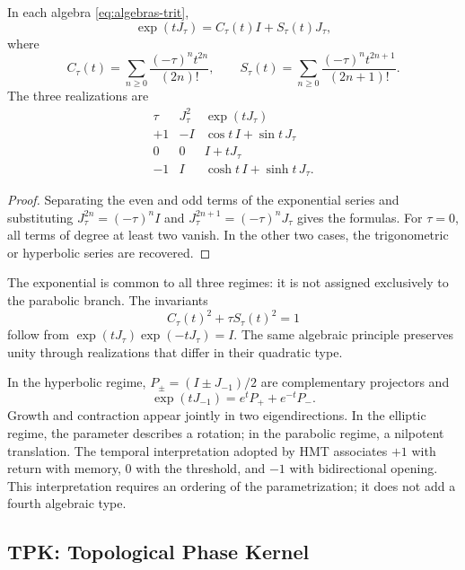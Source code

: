 \begin{proposition}
In each algebra \eqref{eq:algebras-trit},
\begin{equation}
 \exp(tJ_\tau)=C_\tau(t)I+S_\tau(t)J_\tau,
\end{equation}
where
\[
 C_\tau(t)=\sum_{n\ge0}\frac{(-\tau)^nt^{2n}}{(2n)!},\qquad
 S_\tau(t)=\sum_{n\ge0}\frac{(-\tau)^nt^{2n+1}}{(2n+1)!}.
\]
The three realizations are
\[
 \begin{array}{c|c|c}
 \tau&J_\tau^2&\exp(tJ_\tau)\\\hline
 +1&-I&\cos t\,I+\sin t\,J_\tau\\
 0&0&I+tJ_\tau\\
 -1&I&\cosh t\,I+\sinh t\,J_\tau.
 \end{array}
\]
\end{proposition}
\begin{proof}
Separating the even and odd terms of the exponential series and substituting \(J_\tau^{2n}=(-\tau)^nI\) and \(J_\tau^{2n+1}=(-\tau)^nJ_\tau\) gives the formulas. For \(\tau=0\), all terms of degree at least two vanish. In the other two cases, the trigonometric or hyperbolic series are recovered.
\end{proof}

The exponential is common to all three regimes: it is not assigned exclusively to the parabolic branch. The invariants
\[
 C_\tau(t)^2+\tau S_\tau(t)^2=1
\]
follow from \(\exp(tJ_\tau)\exp(-tJ_\tau)=I\). The same algebraic principle preserves unity through realizations that differ in their quadratic type.

In the hyperbolic regime, \(P_\pm=(I\pm J_{-1})/2\) are complementary projectors and
\[
 \exp(tJ_{-1})=e^tP_++e^{-t}P_-.
\]
Growth and contraction appear jointly in two eigendirections. In the elliptic regime, the parameter describes a rotation; in the parabolic regime, a nilpotent translation. The temporal interpretation adopted by HMT associates \(+1\) with return with memory, \(0\) with the threshold, and \(-1\) with bidirectional opening. This interpretation requires an ordering of the parametrization; it does not add a fourth algebraic type.





\newpage
\subsection{TPK: Topological Phase Kernel}

